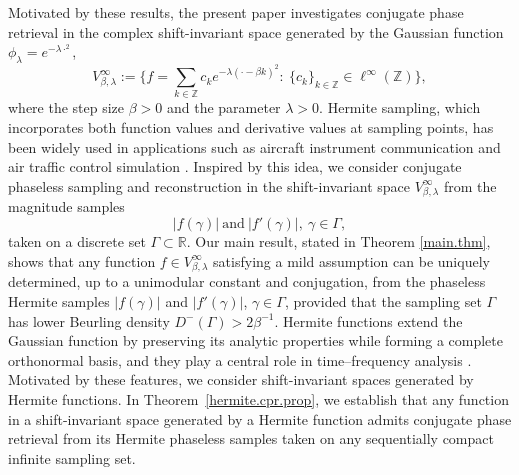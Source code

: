 \documentclass[11pt,oneside,reqno]{amsart}
\numberwithin{equation}{section}
\begin{document}
Motivated by these results, the present paper investigates conjugate phase retrieval in the complex
shift-invariant space generated by the Gaussian function $\phi_\lambda= e^{-\lambda \cdot^2}$,
\begin{equation}\label{sis.def}
V^\infty_{\beta,\lambda}
:= \Big\{
f = \sum_{k \in \mathbb{Z}} c_k e^{-\lambda(\cdot - \beta k)^2}
:\ \{c_k\}_{k \in \mathbb{Z}} \in \ell^\infty(\mathbb{Z})
\Big\},
\end{equation}
where the step size $\beta > 0$ and the parameter $\lambda > 0$. Hermite sampling, which incorporates both function values and derivative values at
sampling points, has been widely used in applications such as aircraft instrument
communication and air traffic control simulation \cite{CQ22, CW23, GRS2020, LLW21,  Mcdonald}.
Inspired by this idea, we consider conjugate phaseless sampling and reconstruction
in the shift-invariant space $V^\infty_{\beta,\lambda}$ from the magnitude samples
\[
|f(\gamma)| \ \text{and} \ |f'(\gamma)|, \ \gamma \in \Gamma,
\]
taken on a discrete set $\Gamma \subset \mathbb{R}$. Our main result, stated in Theorem \ref{main.thm}, shows that any function
$f \in V^\infty_{\beta,\lambda}$ satisfying a mild assumption can be uniquely
determined, up to a unimodular constant and conjugation, from the phaseless Hermite
samples $|f(\gamma)|$ and $|f'(\gamma)|$, $\gamma \in \Gamma$, provided that the
sampling set $\Gamma$ has lower Beurling density
$D^{-}(\Gamma) > 2\beta^{-1}$.
Hermite functions extend the Gaussian function by preserving its  analytic properties while forming a complete orthonormal basis, and they play a central role in time–frequency analysis \cite{abreu2014, cohenbook, szego75}.  Motivated by these features, we consider shift-invariant spaces generated by Hermite functions. In Theorem~\ref{hermite.cpr.prop}, we establish that any function in a shift-invariant space generated by a Hermite function admits conjugate phase retrieval from its Hermite phaseless samples taken on any sequentially compact infinite sampling set.
\end{document}
